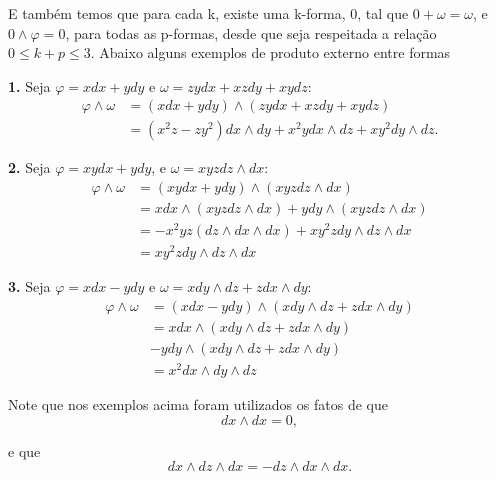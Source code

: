 E também temos que para cada k, existe uma k-forma, $0$, tal que 
$0 + \omega = \omega$, e $0\wedge\varphi = 0$, para todas as 
p-formas, desde que seja respeitada a relação $0 \leq k + p \leq 3$. Abaixo alguns exemplos de produto externo entre formas

\vspace{0.2cm}\noindent\textbf{1.} Seja $\varphi = x dx + y dy$ e 
$\omega = zy dx + xz dy + xy dz$:
%
\begin{align}
\nonumber \varphi \wedge \omega &= (x dx + y dy) \wedge (zy dx + xz dy + xy dz) 
\\
&= (x^2z- zy^2) dx \wedge dy + x^2y dx \wedge dz + xy^2 dy \wedge dz.
\end{align}


\vspace{0.2cm}\noindent\textbf{2.} Seja $\varphi = xy dx + y dy$, e $\omega = xyz dz \wedge dx$:
%
\begin{align}
\nonumber \varphi \wedge \omega &= (xy dx + y dy) \wedge (xyz dz \wedge dx) \\
\nonumber &= x dx \wedge (xyz dz \wedge dx) + y dy                       \wedge (xyz dz \wedge dx)
\\
\nonumber &= - x^2yz (dz \wedge dx \wedge dx) + xy^2z dy \wedge dz \wedge dx
\\
&= xy^2z dy \wedge dz \wedge dx
\end{align}


\vspace{0.2cm}\noindent\textbf{3.} Seja $\varphi = x dx - y dy$ e 
$\omega = x dy \wedge dz + z dx \wedge dy$:
%
\begin{align}
\nonumber \varphi \wedge \omega &= (x dx - y dy) \wedge (x dy \wedge dz + z dx \wedge dy) 
\\
\nonumber &= x dx \wedge (x dy \wedge dz + z dx \wedge dy) 
\\
\nonumber &- y dy \wedge (x dy \wedge dz + z dx \wedge dy)
\\
&= x^2 dx \wedge dy \wedge dz 
\end{align}

Note que nos exemplos acima foram utilizados os fatos de que 
%
\begin{equation}
dx \wedge dx = 0,    
\end{equation}

e que 
%
\begin{equation}
dx \wedge dz \wedge dx = - dz \wedge dx \wedge dx.    
\end{equation}




